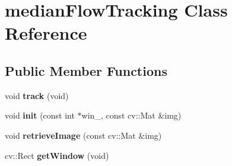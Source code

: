 \hypertarget{classmedianFlowTracking}{\section{median\-Flow\-Tracking \-Class \-Reference}
\label{classmedianFlowTracking}
}
\subsection*{\-Public \-Member \-Functions}
\begin{DoxyCompactItemize}
\item 
\hypertarget{classmedianFlowTracking_a9f70e88e2b732aa8896a57f2b36cb88f}{void {\bfseries track} (void)}\label{classmedianFlowTracking_a9f70e88e2b732aa8896a57f2b36cb88f}

\item 
\hypertarget{classmedianFlowTracking_af9674d6b70109899dce342d2eae8c1bb}{void {\bfseries init} (const int $\ast$win\-\_\-, const cv\-::\-Mat \&img)}\label{classmedianFlowTracking_af9674d6b70109899dce342d2eae8c1bb}

\item 
\hypertarget{classmedianFlowTracking_aec1759859b49d314751a905032a89846}{void {\bfseries retrieve\-Image} (const cv\-::\-Mat \&img)}\label{classmedianFlowTracking_aec1759859b49d314751a905032a89846}

\item 
\hypertarget{classmedianFlowTracking_a55ecebda4bb9effc91ad49e274f9230a}{cv\-::\-Rect {\bfseries get\-Window} (void)}\label{classmedianFlowTracking_a55ecebda4bb9effc91ad49e274f9230a}

\end{DoxyCompactItemize}
